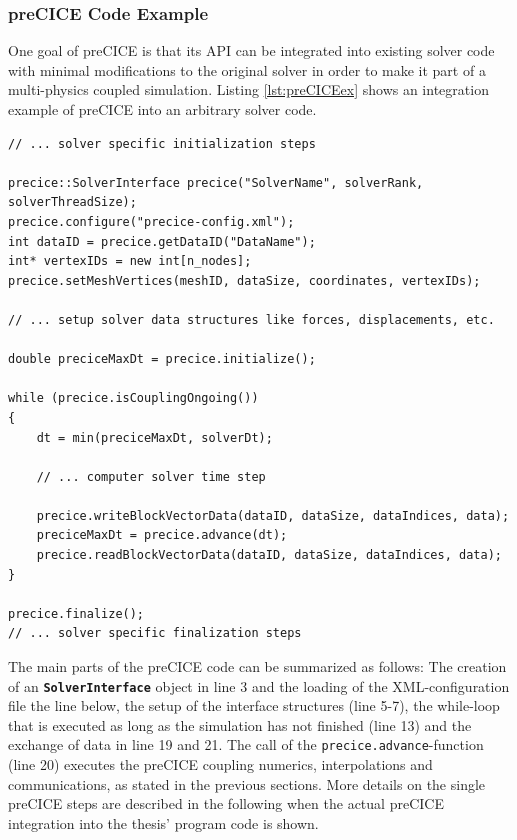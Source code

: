   \subsubsection{preCICE Code Example}\label{sec:Coupl-Impl-Example}
   One goal of preCICE is that its API can be integrated into existing solver code with minimal modifications to the original solver in order to make it part of a multi-physics coupled simulation. Listing \ref{lst:preCICEex} shows an integration example of preCICE into an arbitrary solver code.
\begin{lstlisting}[caption=preCICE Integration Example,label=lst:preCICEex,keepspaces=true]
// ... solver specific initialization steps

precice::SolverInterface precice("SolverName", solverRank, solverThreadSize);
precice.configure("precice-config.xml");
int dataID = precice.getDataID("DataName");
int* vertexIDs = new int[n_nodes];
precice.setMeshVertices(meshID, dataSize, coordinates, vertexIDs);

// ... setup solver data structures like forces, displacements, etc.

double preciceMaxDt = precice.initialize();

while (precice.isCouplingOngoing())
{
	dt = min(preciceMaxDt, solverDt);

	// ... computer solver time step

	precice.writeBlockVectorData(dataID, dataSize, dataIndices, data);
	preciceMaxDt = precice.advance(dt);
	precice.readBlockVectorData(dataID, dataSize, dataIndices, data);
}

precice.finalize();
// ... solver specific finalization steps
\end{lstlisting}
   The main parts of the preCICE code can be summarized as follows: The creation of an \texttt{\textbf{SolverInterface}} object in line 3 and the loading of the XML-configuration file the line below, the setup of the interface structures (line 5-7), the while-loop that is executed as long as the simulation has not finished (line 13) and the exchange of data in line 19 and 21. The call of the \texttt{precice.advance}-function (line 20) executes the preCICE coupling numerics, interpolations and communications, as stated in the previous sections. More details on the single preCICE steps are described in the following when the actual preCICE integration into the thesis' program code is shown.
   
